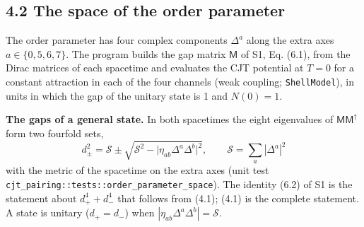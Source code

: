 \documentclass[
  10pt,
]{article}
\begin{document}
\hypertarget{the-space-of-the-order-parameter}{%
\subsection{4.2 The space of the order
parameter}\label{the-space-of-the-order-parameter}}

The order parameter has four complex components \(\Delta^a\) along the
extra axes \(a\in\{0,5,6,7\}\). The program builds the gap matrix
\(\mathsf M\) of S1, Eq. (6.1), from the Dirac matrices of each
spacetime and evaluates the CJT potential at \(T=0\) for a constant
attraction in each of the four channels (weak coupling;
\texttt{ShellModel}), in units in which the gap of the unitary state is
1 and \(N(0)=1\).

\textbf{The gaps of a general state.} In both spacetimes the eight
eigenvalues of \(\mathsf M\mathsf M^\dagger\) form two fourfold sets,
\[\boxed{\;d_\pm^2=\mathcal S\pm\sqrt{\mathcal S^2-\big|\eta_{ab}\Delta^a\Delta^b\big|^2},\qquad\mathcal S=\sum_a|\Delta^a|^2\;}\tag{4.1}\]
with the metric of the spacetime on the extra axes (unit test
\texttt{cjt\_pairing::tests::order\_parameter\_space}). The identity
(6.2) of S1 is the statement about \(d_+^4+d_-^4\) that follows from
(4.1); (4.1) is the complete statement. A state is unitary (\(d_+=d_-\))
when \(|\eta_{ab}\Delta^a\Delta^b|=\mathcal S\).
\end{document}
